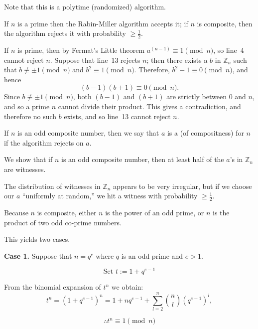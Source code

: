 \begin{frame}

Note that this is a polytime (randomized) algorithm.

If $n$ is a prime then the Rabin-Miller algorithm accepts it; if $n$
is composite, then the algorithm rejects it with probability
$\ge\frac{1}{2}$.

If $n$ is prime, then by Fermat's Little 
theorem $a^{(n-1)}\equiv 1\pmod n$,
so line~4 cannot reject $n$.  Suppose that line~13 rejects $n$; then
there exists a $b$ in $\mathbb{Z}_n$ such that $b\not\equiv\pm
1\pmod n$ and $b^2\equiv 1\pmod n$.  Therefore, $b^2-1\equiv 0\pmod
n$, and hence
$$
(b-1)(b+1)\equiv 0\pmod n.
$$
Since $b\not\equiv\pm 1\pmod n$, both $(b-1)$ and $(b+1)$ are strictly
between $0$ and $n$, and so a prime $n$ cannot divide their product.
This gives a contradiction, and therefore no such $b$ exists, and so
line~13 cannot reject $n$.

\end{frame}

\begin{frame}

If $n$ is an odd composite number, then we say that $a$ is a
 (of compositness) for $n$ if the algorithm rejects on
$a$.

We show that if $n$ is an odd composite number, then at least half of
the $a$'s in $\mathbb{Z}_n$ are witnesses.  

The distribution of
witnesses in $\mathbb{Z}_n$ appears to be very irregular, but if we
choose our $a$ ``uniformly at random,'' we hit a witness with probability
$\ge\frac{1}{2}$.

Because $n$ is composite, either $n$ is the power of an odd prime, or
$n$ is the product of two odd co-prime numbers.

This yields two cases.

\end{frame}

\begin{frame}

{\bf Case 1.}  Suppose that $n=q^e$ where $q$ is an odd prime and
$e>1$.  

\begin{equation}\label{eq:firstt}
\text{Set } t:=1+q^{e-1}
\end{equation}

From the binomial expansion of $t^n$ we
obtain:
\begin{equation}\label{eq:witness}
t^n=(1+q^{e-1})^n=1+nq^{e-1}+\sum_{l=2}^n\binom{n}{l}(q^{e-1})^l,
\end{equation} 

\begin{equation}\label{eq:secondt}
\therefore t^n\equiv 1\pmod n
\end{equation}

\end{frame}

